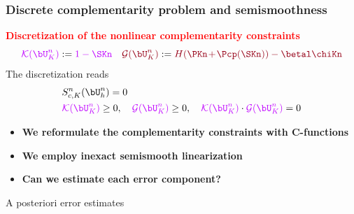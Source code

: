 \documentclass[aspectratio=169]{beamer}
\begin{document}
%
\begin{frame}
\frametitle{Discrete complementarity problem and semismoothness}
\textcolor{red}{\textbf{Discretization of the nonlinear complementarity constraints}}
\begin{equation*}
\textcolor{electricpurple}{\mathcal{K}(\bU_K^n)} \egaldef \textcolor{electricpurple}{1-\SKn} \quad \textcolor{carmine} {\mathcal{G}(\bU_K^n)} \egaldef  \textcolor{carmine}{H(\PKn\hspace{-0.05 cm}+\hspace{-0.05 cm}\Pcp(\SKn))-\betal \chiKn}
\end{equation*}
\pause
The discretization reads
\begin{equation*}
\begin{split}
&S_{c,K}^n(\bU_h^n)=0\\
& \textcolor{electricpurple}{\mathcal{K}(\bU_K^n)} \geq 0, \quad   \textcolor{electricpurple}{\mathcal{G}(\bU_K^n)} \geq 0, \quad \textcolor{electricpurple}{\mathcal{K}(\bU_K^n)} \cdot \textcolor{electricpurple}{\mathcal{G}(\bU_K^n)}=0
\end{split}
\end{equation*}
\pause
\begin{itemize}
\item
\textcolor{cadmiumgreen}{\textbf{We reformulate the complementarity constraints with C-functions}}
\item
\textcolor{cadmiumgreen}{\textbf{We employ inexact semismooth linearization}}
\item
\textcolor{cadmiumgreen}{\textbf{Can we estimate each error component?}}
\end{itemize}
\end{frame} 
%
\begin{frame}
\centering
\Huge{\textcolor{carmine}{A posteriori error estimates}}
\end{frame}
%
\end{document}
